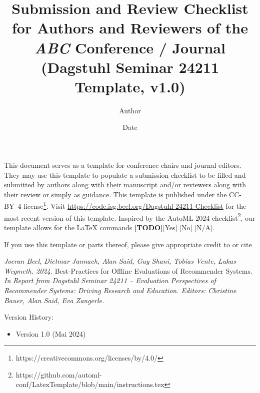 \documentclass{article}
\title{Submission and Review Checklist for Authors and Reviewers of the \textit{ABC} Conference / Journal \\
(Dagstuhl Seminar 24211 Template, v1.0)}
\author{Author}
\date{Date}
\begin{document}

\newcommand{\answerYes}[1]{{\textcolor{answerYesColor}{[Yes]}\xspace#1}}
\newcommand{\answerNo}[1]{{\textcolor{answerNoColor}{[No]}\xspace#1}}
\newcommand{\answerNA}[1]{{\textcolor{answerNAColor}{[N/A]}\xspace#1}}
\newcommand{\answerTODO}{\textcolor{answerTODOColor}{\textbf{[TODO]}}}


\maketitle

\noindent This document serves as a template for conference chairs and journal editors. They may use this template to populate a submission checklist to be filled and submitted by authors along with their manuscript and/or reviewers along with their review or simply as guidance. This template is published under the CC-BY~4 license\footnote{https://creativecommons.org/licenses/by/4.0/}. Visit 
 \href{https://code.isg.beel.org/Dagstuhl-24211-Checklist}{https://code.isg.beel.org/Dagstuhl-24211-Checklist} for the most recent version of this template. Inspired by the AutoML 2024 checklist\footnote{https://github.com/automl-conf/LatexTemplate/blob/main/instructions.tex}, our template allows for the LaTeX commands \answerTODO \answerYes{} \answerNo{} \answerNA{}.

If you use this template or parts thereof, please give appropriate credit to or cite

\begin{displayquote}
\textit{Joeran Beel, Dietmar Jannach, Alan Said, Guy Shani, Tobias Vente, Lukas Wegmeth. 2024. }Best-Practices for Offline Evaluations of Recommender Systems\textit{. In Report from Dagstuhl Seminar 24211 -- Evaluation Perspectives of Recommender Systems: Driving Research and Education. Editors: Christine Bauer, Alan Said, Eva Zangerle.}
\end{displayquote}
Version History:
\begin{itemize}
    \item Version 1.0 (Mai 2024)
\end{itemize}


\end{document}
